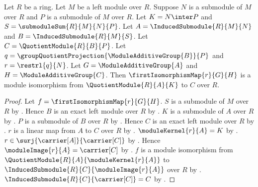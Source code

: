 \begin{theorem}\label{module_second_isomorphism_theorem}
    Let $R$ be a ring.
    Let $M$ be a left module over $R$.
    Suppose $N$ is a submodule of $M$ over $R$ and
        $P$ is a submodule of $M$ over $R$.
    Let $K=N\inter P$ and $S=\submoduleSum{R}{M}{N}{P}$.
    Let $A=\InducedSubmodule{R}{M}{N}$ and
        $B=\InducedSubmodule{R}{M}{S}$.
    Let $C=\QuotientModule{R}{B}{P}$.
    Let $q=\groupQuotientProjection{\ModuleAdditiveGroup{B}}{P}$ and
        $r=\restrl{q}{N}$.
    Let $G=\ModuleAdditiveGroup{A}$ and
        $H=\ModuleAdditiveGroup{C}$.
    Then $\firstIsomorphismMap{r}{G}{H}$ is a module isomorphism from
        $\QuotientModule{R}{A}{K}$ to $C$ over $R$.
\end{theorem}
\begin{proof}
    Let $f=\firstIsomorphismMap{r}{G}{H}$.
    $S$ is a submodule of $M$ over $R$ by
        .
    Hence $B$ is an exact left module over $R$ by
        .
    $K$ is a submodule of $A$ over $R$ by
        .
    $P$ is a submodule of $B$ over $R$ by
        .
    Hence $C$ is an exact left module over $R$ by
        .
    $r$ is a linear map from $A$ to $C$ over $R$ by
        .
    $\moduleKernel{r}{A}=K$ by
        .
    $r\in\surj{\carrier[A]}{\carrier[C]}$ by
        .
    Hence $\moduleImage{r}{A}=\carrier[C]$ by
        .
    $f$ is a module isomorphism from
        $\QuotientModule{R}{A}{\moduleKernel{r}{A}}$ to
        $\InducedSubmodule{R}{C}{\moduleImage{r}{A}}$
        over $R$ by .
    $\InducedSubmodule{R}{C}{\carrier[C]}=C$ by
        .
\end{proof}

